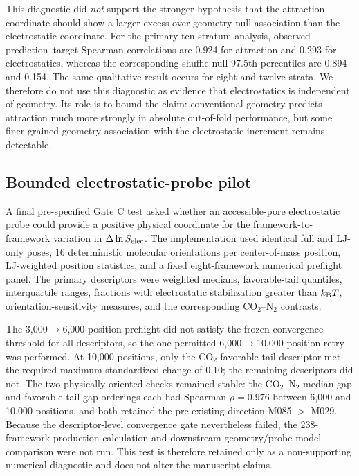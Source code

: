 \documentclass[11pt,a4paper]{article}
\begin{document}
This diagnostic did \emph{not} support the stronger hypothesis that the attraction coordinate should show a larger excess-over-geometry-null association than the electrostatic coordinate. For the primary ten-stratum analysis, observed prediction--target Spearman correlations are 0.924 for attraction and 0.293 for electrostatics, whereas the corresponding shuffle-null 97.5th percentiles are 0.894 and 0.154. The same qualitative result occurs for eight and twelve strata. We therefore do not use this diagnostic as evidence that electrostatics is independent of geometry. Its role is to bound the claim: conventional geometry predicts attraction much more strongly in absolute out-of-fold performance, but some finer-grained geometry association with the electrostatic increment remains detectable.

\subsection{Bounded electrostatic-probe pilot}

A final pre-specified Gate C test asked whether an accessible-pore electrostatic probe could provide a positive physical coordinate for the framework-to-framework variation in $\Delta\ln S_{\rm elec}$. The implementation used identical full and LJ-only poses, 16 deterministic molecular orientations per center-of-mass position, LJ-weighted position statistics, and a fixed eight-framework numerical preflight panel. The primary descriptors were weighted medians, favorable-tail quantiles, interquartile ranges, fractions with electrostatic stabilization greater than $k_{\rm B}T$, orientation-sensitivity measures, and the corresponding CO$_2$--N$_2$ contrasts.

The 3,000$\rightarrow$6,000-position preflight did not satisfy the frozen convergence threshold for all descriptors, so the one permitted 6,000$\rightarrow$10,000-position retry was performed. At 10,000 positions, only the CO$_2$ favorable-tail descriptor met the required maximum standardized change of 0.10; the remaining descriptors did not. The two physically oriented checks remained stable: the CO$_2$--N$_2$ median-gap and favorable-tail-gap orderings each had Spearman $\rho=0.976$ between 6,000 and 10,000 positions, and both retained the pre-existing direction M085 $>$ M029. Because the descriptor-level convergence gate nevertheless failed, the 238-framework production calculation and downstream geometry/probe model comparison were not run. This test is therefore retained only as a non-supporting numerical diagnostic and does not alter the manuscript claims.
\end{document}
